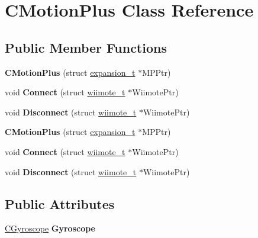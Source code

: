 \hypertarget{class_c_motion_plus}{\section{C\-Motion\-Plus Class Reference}
\label{class_c_motion_plus}
}
\subsection*{Public Member Functions}
\begin{DoxyCompactItemize}
\item 
\hypertarget{class_c_motion_plus_a6a7d7e2765c93610e2d62f343d254259}{{\bfseries C\-Motion\-Plus} (struct \hyperlink{structexpansion__t}{expansion\-\_\-t} $\ast$M\-P\-Ptr)}\label{class_c_motion_plus_a6a7d7e2765c93610e2d62f343d254259}

\item 
\hypertarget{class_c_motion_plus_a6f1816446589b1daa218eb04bd3aa9e2}{void {\bfseries Connect} (struct \hyperlink{structwiimote__t}{wiimote\-\_\-t} $\ast$Wiimote\-Ptr)}\label{class_c_motion_plus_a6f1816446589b1daa218eb04bd3aa9e2}

\item 
\hypertarget{class_c_motion_plus_a550b257a0dd6214094caf705a6cf5ee7}{void {\bfseries Disconnect} (struct \hyperlink{structwiimote__t}{wiimote\-\_\-t} $\ast$Wiimote\-Ptr)}\label{class_c_motion_plus_a550b257a0dd6214094caf705a6cf5ee7}

\item 
\hypertarget{class_c_motion_plus_a6a7d7e2765c93610e2d62f343d254259}{{\bfseries C\-Motion\-Plus} (struct \hyperlink{structexpansion__t}{expansion\-\_\-t} $\ast$M\-P\-Ptr)}\label{class_c_motion_plus_a6a7d7e2765c93610e2d62f343d254259}

\item 
\hypertarget{class_c_motion_plus_a6f1816446589b1daa218eb04bd3aa9e2}{void {\bfseries Connect} (struct \hyperlink{structwiimote__t}{wiimote\-\_\-t} $\ast$Wiimote\-Ptr)}\label{class_c_motion_plus_a6f1816446589b1daa218eb04bd3aa9e2}

\item 
\hypertarget{class_c_motion_plus_a550b257a0dd6214094caf705a6cf5ee7}{void {\bfseries Disconnect} (struct \hyperlink{structwiimote__t}{wiimote\-\_\-t} $\ast$Wiimote\-Ptr)}\label{class_c_motion_plus_a550b257a0dd6214094caf705a6cf5ee7}

\end{DoxyCompactItemize}
\subsection*{Public Attributes}
\begin{DoxyCompactItemize}
\item 
\hypertarget{class_c_motion_plus_af0b450efc55f0f6808d1e67746f9542f}{\hyperlink{class_c_gyroscope}{C\-Gyroscope} {\bfseries Gyroscope}}\label{class_c_motion_plus_af0b450efc55f0f6808d1e67746f9542f}

\end{DoxyCompactItemize}
